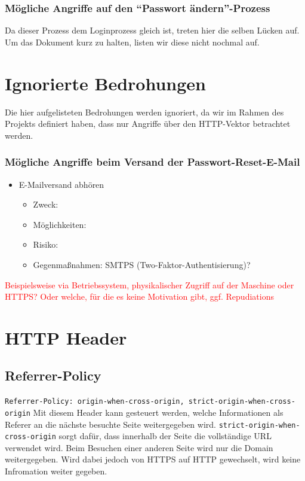 \documentclass[12pt,DIV14,BCOR10mm,a4paper,twoside,parskip=half-,headsepline,headinclude,english,ngerman,bibliography=totocnumbered]{scrreprt}
\begin{document}
\subsubsection{Mögliche Angriffe auf den \enquote{Passwort ändern}-Prozess}

Da dieser Prozess dem Loginprozess gleich ist, treten hier die selben Lücken auf.
Um das Dokument kurz zu halten, listen wir diese nicht nochmal auf.

\section{Ignorierte Bedrohungen}

Die hier aufgelisteten Bedrohungen werden ignoriert, da wir im Rahmen des Projekts definiert haben, dass nur Angriffe über den HTTP-Vektor betrachtet werden.

\subsubsection{Mögliche Angriffe beim Versand der Passwort-Reset-E-Mail}

\begin{itemize}
\item E-Mailversand abhören
  \begin{itemize}
  \item Zweck:
  \item Möglichkeiten:
  \item Risiko:
  \item Gegenmaßnahmen: SMTPS (Two-Faktor-Authentisierung)?
  \end{itemize}
\end{itemize}

\textcolor{red}{
Beispielsweise via Betriebssystem, physikalischer Zugriff auf der Maschine oder HTTPS?
Oder welche, für die es keine Motivation gibt, ggf. Repudiations
}


\section{HTTP Header}

\subsection{Referrer-Policy}
\texttt{Referrer-Policy: origin-when-cross-origin, strict-origin-when-cross-origin}\newline
Mit diesem Header kann gesteuert werden, welche Informationen als Referer an die nächste besuchte Seite weitergegeben wird. \texttt{strict-origin-when-cross-origin} sorgt dafür, dass innerhalb der Seite die vollständige URL verwendet wird. Beim Besuchen einer anderen Seite wird nur die Domain weitergegeben. Wird dabei jedoch von HTTPS auf HTTP gewechselt, wird keine Infromation weiter gegeben.
\end{document}
